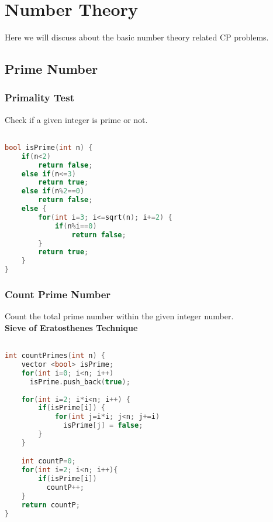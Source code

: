 \newpage
\chapter{Number Theory}
Here we will discuss about the basic number theory related CP problems.

\section{Prime Number}

\subsection{Primality Test}
Check if a given integer is prime or not.

\begin{lstlisting}[language=C++]

bool isPrime(int n) {
	if(n<2)
		return false;
	else if(n<=3)
		return true;
	else if(n%2==0)
		return false;
	else {
		for(int i=3; i<=sqrt(n); i+=2) {
			if(n%i==0)
				return false;		
		}
		return true;
	}
}

\end{lstlisting}

\newpage
\subsection{Count Prime Number}
Count the total prime number within the given integer number.\\

\textbf{Sieve of Eratosthenes Technique}
\begin{lstlisting}[language=C++]

int countPrimes(int n) {
    vector <bool> isPrime;
    for(int i=0; i<n; i++)
      isPrime.push_back(true);
    
    for(int i=2; i*i<n; i++) {
        if(isPrime[i]) {
            for(int j=i*i; j<n; j+=i)
              isPrime[j] = false;
        }
    }

    int countP=0;
    for(int i=2; i<n; i++){
        if(isPrime[i])
          countP++;
    }
    return countP;
}

\end{lstlisting}